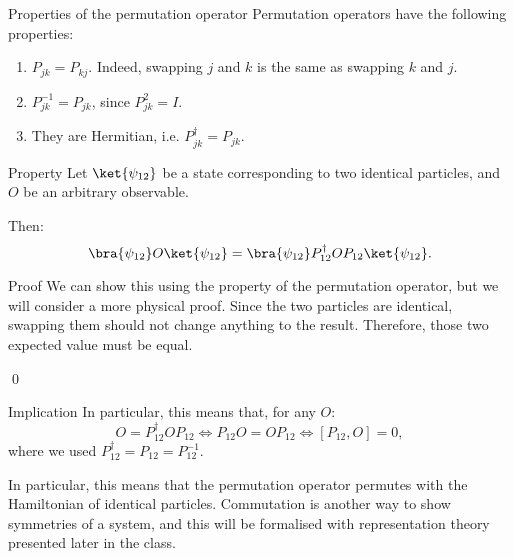\documentclass[a4paper]{article}
\begin{document}
\begin{parag}{Properties of the permutation operator}
    Permutation operators have the following properties:
    \begin{enumerate}
        \item $P_{jk} = P_{kj}$. Indeed, swapping $j$ and $k$ is the same as swapping $k$ and $j$.
        \item $P_{jk}^{-1} = P_{jk}$, since $P_{jk}^2 = I.$
        \item They are Hermitian, i.e. $P_{jk}^{\dagger} = P_{jk}$.
    \end{enumerate}
\end{parag}

\begin{parag}{Property}
    Let $\ket{\psi_{12}}$ be a state corresponding to two identical particles, and $O$ be an arbitrary observable.

    Then: 
    \[\bra{\psi_{12}}O \ket{\psi_{12}} = \bra{\psi_{12}} P_{12}^{\dagger} O P_{12} \ket{\psi_{12}}.\]
   
    \begin{subparag}{Proof}
        We can show this using the property of the permutation operator, but we will consider a more physical proof. Since the two particles are identical, swapping them should not change anything to the result. Therefore, those two expected value must be equal.

        \qed
    \end{subparag}

    \begin{subparag}{Implication}
        In particular, this means that, for any $O$: 
        \[O = P_{12}^{\dagger} O P_{12} \iff P_{12} O = O P_{12} \iff \left[P_{12}, O\right] = 0,\]
        where we used $P_{12}^{\dagger} = P_{12} = P_{12}^{-1}$.

        In particular, this means that the permutation operator permutes with the Hamiltonian of identical particles. Commutation is another way to show symmetries of a system, and this will be formalised with representation theory presented later in the class.
    \end{subparag}
\end{parag}
\end{document}
